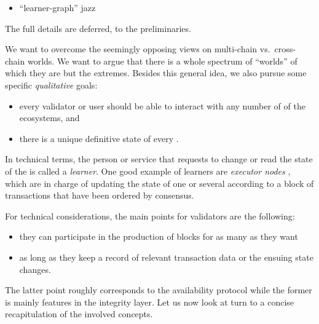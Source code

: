 {\begin{itemize}
{\begin{quote}
        \\…\\
        Charlotte provides a common framework for data structures from separate
        services to \ul{reference each other}.
        \\…\\
        Charlotte data structures are naturally composable: the \emph{union} of two data structures is itself a
        data structure
        \\…\\
        the \emph{intersection} of two data
        structures comprises the data that is part of both structures. We can think of \ul{cross-shard} transactions
        appended to a sharded blockchain ADDS as data in the intersection of multiple shard ADDSs.
      \end{quote}
    }%
  \item “learner-graph” jazz
  \end{itemize}
  The full details are deferred,
  \eg to the preliminaries. 
}


We want to overcome the seemingly opposing views on multi-chain vs.\ cross-chain worlds. %
We want to argue that there is a whole spectrum of ``worlds'' of which they are
but the extremes. %
Besides this general idea, %
we also pursue some specific \emph{qualitative} goals: %
\begin{itemize} %
\item every validator or user should be able to interact with any number of \base[s] of the ecosystems, %
  and %
\item there is a unique definitive state of every \base.
\end{itemize}
In technical terms, %
the person or service that requests to change or read the state of the \base[s]
is called a \emph{learner}. %
One good example of learners are \emph{executor nodes} %
\cite{anomaSpecs}, %
which are in charge of updating the state of one or several \base[s] %
according to a block of transactions that have been ordered by consensus. %

For technical considerations,
the main points for validators are the following:
\begin{itemize}
\item %
  they can participate in the production of blocks for %
  as many \base[s] as they want %
\item %
  as long as they keep a record of relevant %
  transaction data or the ensuing state changes. %
\end{itemize}
The latter point roughly corresponds to the availability protocol %
while the former is mainly features in the integrity layer. %
Let us now look at turn to a concise recapitulation of the involved concepts. %

\color{black}
